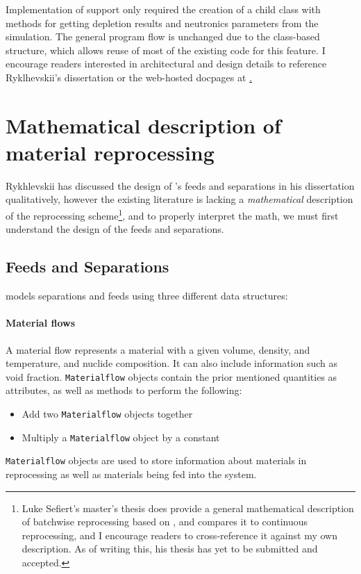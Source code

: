 Implementation of \OpenMC support only required the creation of a child class
with methods for getting depletion results and neutronics parameters from the
\OpenMC simulation. The general program flow is unchanged due to the
class-based structure, which allows reuse of most of the existing code for
this feature. I encourage readers interested in architectural and design
details to reference Ryklhevskii's dissertation \cite{rykhlevskii_fuel_2020}
or the web-hosted \SaltProc docpages at \href{arfc.github.io/saltproc}.


\section{Mathematical description of material reprocessing}
Rykhlevskii has discussed the design of \SaltProc's feeds and separations in
his dissertation qualitatively, however the existing \SaltProc literature is lacking a {\it mathematical} description of the reprocessing scheme\footnote{Luke Sefiert's master's thesis does provide a general
mathematical description of batchwise reprocessing based on \SaltProc, and
compares it to continuous reprocessing, and I encourage readers to
cross-reference it against my own description. As of writing this, his thesis
has yet to be submitted and accepted.}, and to properly interpret the math, we
must first understand the design of the feeds and separations.

\subsection{Feeds and Separations}
\SaltProc models separations and feeds using three different data structures:

\paragraph{Material flows}
    A material flow represents a material with a given
    volume, density, and temperature, and nuclide composition.
    It can also include information such as void fraction. \verb.Materialflow.
    objects contain the prior mentioned quantities as attributes, as well as
    methods to perform the following:
    \begin{itemize}
        \item Add two \verb.Materialflow. objects together
        \item Multiply a \verb.Materialflow. object by a constant
    \end{itemize}
    \verb.Materialflow. objects are used to store information about materials
    in reprocessing as well as materials being fed into the system.

